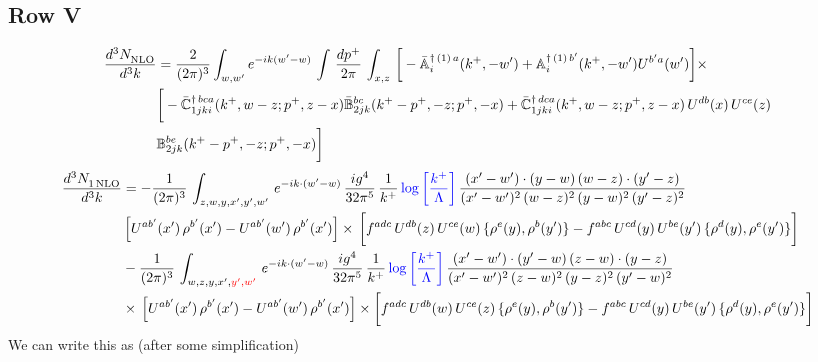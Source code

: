 \documentclass[9pt]{article}
\def\mf#1{\mathbb{#1}}
\numberwithin{equation}{section}
\begin{document}
\subsection{Row V}
\begin{align}
    \frac{d^{3}N_{\rm NLO}^{\rm}}{d^{3}k}  & = \frac{2}{(2\pi)^{3}}  \int_{w, w^\prime} e^{-ik(w^\prime-w)}\, \int\, \frac{dp^{+}}{2\pi}\,\int_{x,z}\, \bigg[-\bar{\mf{A}}^{\dagger\,(1)\,a}_{i}(k^{+},-w^{\prime})+\mf{A}^{\dagger\, (1)\, b^{\prime}}_{i}(k^{+},-w^{\prime})U^{b^{\prime}a}(w^{\prime})\bigg]\times\notag \\ & \bigg[-\Bar{\mf{C}}^{\dagger\, bca}_{1jki}(k^{+},w-z;p^{+},z-x)\Bar{\mf{B}}^{bc}_{2jk}(k^{+}-p^{+},- z;p^{+},-x)+\bar{\mf{C}}^{\dagger\, dca}_{1jki}(k^+,w-z; p^+, z-x)\,U^{db}(x)\,U^{ce}(z) \notag \\ & {\mf{B}}^{be}_{2jk} (k^{+}-p^+, -z; p^+, -x) \bigg]\nonumber
\end{align}
\begin{align}
     \frac{d^{3}N_{1\,\rm NLO}^{\rm}}{d^{3}k}  & =  -\frac{1}{(2\pi)^{3}}\, \int_{z,w,y,x',y',w'}\,e^{-ik\cdot (w^\prime-w)}\,\frac{ig^{4}}{32\pi^{5}}\, \frac{1}{k^{+}}\,{\color{blue}\log{\left[\frac{k^{+}}{\Lambda}\right]}}\,\frac{(x'-w')\cdot (y-w)\,(w-z)\cdot (y'-z)}{(x'-w')^{2}\,(w-z)^{2}\,(y-w)^{2}\,(y'-z)^{2}}\,\notag \\ & \left[U^{ab'}(x')\,\rho^{b'}(x')-U^{ab'}(w')\,\rho^{b'}(x')\right]\times\, \bigg[f^{adc}\,U^{db}(z)\,U^{ce}(w)\, \{\rho^{e}(y),\rho^{b}(y')\}-f^{abc}\,U^{cd}(y)\,U^{be}(y')\, \{\rho^{d}(y),\rho^{e}(y')\}\bigg]\notag \\ &  -\frac{1}{(2\pi)^{3}}\, \int_{w,z,y,x',{\color{red}y',w'}}\,e^{-ik\cdot (w^\prime-w)}\,\frac{ig^{4}}{32\pi^{5}}\, \frac{1}{k^{+}}\,{\color{blue}\log{\left[\frac{k^{+}}{\Lambda}\right]}}\,\frac{(x'-w')\cdot (y'-w)\,(z-w)\cdot (y-z)}{(x'-w')^{2}\,(z-w)^{2}\,(y-z)^{2}\,(y'-w)^{2}}\notag \\ & \times\, \left[U^{ab'}(x')\,\rho^{b'}(x')-U^{ab'}(w')\,\rho^{b'}(x')\right]\times \bigg[f^{adc}\,U^{db}(w)\,U^{ce}(z)\, \{\rho^{e}(y),\rho^{b}(y')\}-f^{abc}\,U^{cd}(y)\,U^{be}(y')\, \{\rho^{d}(y),\rho^{e}(y')\}\bigg]
\end{align}
We can write this as (after some simplification)
\end{document}
